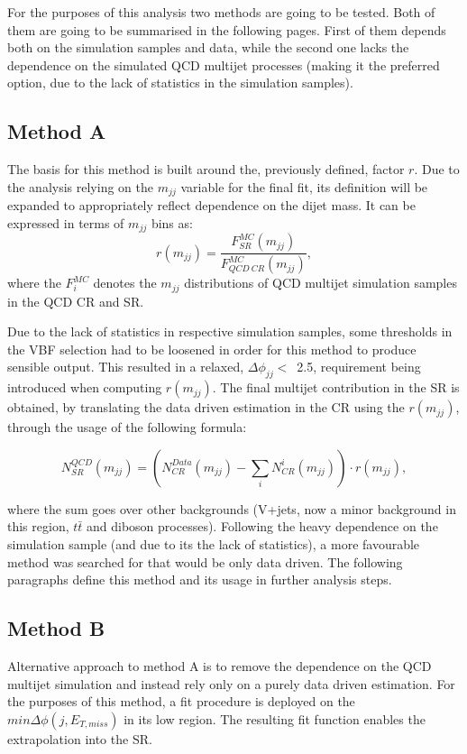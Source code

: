 \hspace{10pt} For the purposes of this analysis two methods are going to be tested. Both of them are going to be summarised in the following pages. First of them depends both on the simulation samples and data, while the second one lacks the dependence on the simulated QCD multijet processes (making it the preferred option, due to the lack of statistics in the simulation samples).

\subsection{Method A}
\hspace{10pt} The basis for this method is built around the, previously defined, factor $r$. Due to the analysis relying on the $m_{jj}$ variable for the final fit, its definition will be expanded to appropriately reflect dependence on the dijet mass. It can be expressed in terms of $m_{jj}$ bins as: 
\begin{equation}
    r(m_{jj}) = \frac{F_{SR}^{MC}(m_{jj})}{F_{QCD~CR}^{MC}(m_{jj})},
\end{equation}
where the $F^{MC}_i$ denotes the $m_{jj}$ distributions of QCD multijet simulation samples in the QCD CR and SR.

\hspace{10pt} Due to the lack of statistics in respective simulation samples, some thresholds in the VBF selection had to be loosened in order for this method to produce sensible output. This resulted in a relaxed, $\Delta\phi_{jj}<$~2.5, requirement being introduced when computing $r(m_{jj})$. The final multijet contribution in the SR is obtained, by translating the data driven estimation in the CR using the $r(m_{jj})$, through the usage of the following formula:

\begin{equation}
    N_{SR}^{QCD}(m_{jj}) = \left( N_{CR}^{Data}(m_{jj}) - \sum_i N^i_{CR}(m_{jj})\right)\cdot r(m_{jj}),
\end{equation}

where the sum goes over other backgrounds (V+jets, now a minor background in this region, $t\bar{t}$ and diboson processes). Following the heavy dependence on the simulation sample (and due to its the lack of statistics), a more favourable method was searched for that would be only data driven. The following paragraphs define this method and its usage in further analysis steps.

\subsection{Method B}
\hspace{10pt} Alternative approach to method A is to remove the dependence on the QCD multijet simulation and instead rely only on a purely data driven estimation. For the purposes of this method, a fit procedure is deployed on the $min\Delta\phi(j, E_{T, miss})$ in its low region. The resulting fit function enables the extrapolation into the SR.

